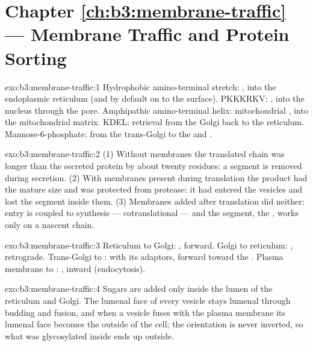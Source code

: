 \section*{Chapter \ref{ch:b3:membrane-traffic} --- Membrane Traffic and Protein Sorting}

\begin{solution}{exo:b3:membrane-traffic:1}
Hydrophobic amino-terminal stretch: , into the
endoplasmic reticulum (and by default on to the surface). PKKKRKV:
, into the nucleus through the pore.
Amphipathic amino-terminal helix: mitochondrial , into the
mitochondrial matrix. KDEL: retrieval from the Golgi back to the
reticulum. Mannose-6-phosphate: from the trans-Golgi to the 
and .
\end{solution}

\begin{solution}{exo:b3:membrane-traffic:2}
(1) Without membranes the translated chain was longer than the secreted
protein by about twenty residues: a segment is removed during
secretion. (2) With membranes present during translation the product
had the mature size and was protected from protease: it had entered
the vesicles and lost the segment inside them. (3) Membranes added
after translation did neither: entry is coupled to synthesis
--- cotranslational --- and the segment, the , works only
on a nascent chain.
\end{solution}

\begin{solution}{exo:b3:membrane-traffic:3}
Reticulum to Golgi: , forward. Golgi to reticulum: ,
retrograde. Trans-Golgi to :  with its adaptors,
forward toward the . Plasma membrane to : ,
inward (endocytosis).
\end{solution}

\begin{solution}{exo:b3:membrane-traffic:4}
Sugars are added only inside the lumen of the reticulum and Golgi. The
lumenal face of every vesicle stays lumenal through budding and fusion,
and when a vesicle fuses with the plasma membrane its lumenal face
becomes the outside of the cell; the orientation is never inverted, so
what was glycosylated inside ends up outside.
\end{solution}

